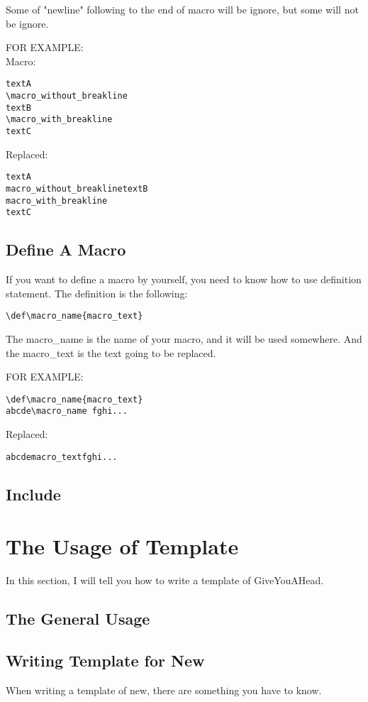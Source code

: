 \documentclass[UTF8]{article} %
\begin{document}
Some of "newline" following to the end of macro will be ignore, but some will not be ignore.

FOR EXAMPLE:\\
Macro:
\begin{lstlisting}
textA
\macro_without_breakline
textB
\macro_with_breakline
textC
\end{lstlisting}
Replaced:
\begin{lstlisting}
textA
macro_without_breaklinetextB
macro_with_breakline
textC
\end{lstlisting}

\subsection{Define A Macro}
If you want to define a macro by yourself, you need to know how to use definition statement.
The definition is the following:
\begin{lstlisting}
\def\macro_name{macro_text}
\end{lstlisting}

The macro_name is the name of your macro, and it will be used somewhere. And the macro_text is the text going to be replaced.

FOR EXAMPLE:
\begin{lstlisting}
\def\macro_name{macro_text}
abcde\macro_name fghi...
\end{lstlisting}
Replaced:
\begin{lstlisting}
abcdemacro_textfghi...
\end{lstlisting}
\subsection{Include}


\newpage
 
\section{The Usage of Template}
In this section, I will tell you how to write a template of GiveYouAHead.
\subsection{The General Usage}
\subsection{Writing Template for New}
When writing a template of new, there are something you have to know.
\end{document}
